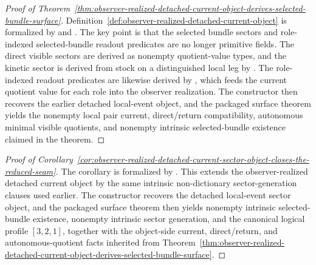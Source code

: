 \begin{proof}[Proof of Theorem~\ref{thm:observer-realized-detached-current-object-derives-selected-bundle-surface}]
\label{proof:thm:observer-realized-detached-current-object-derives-selected-bundle-surface}
Definition~\ref{def:observer-realized-detached-current-object} is formalized by
 and
. The key point is that the selected
bundle sectors and role-indexed selected-bundle readout predicates are no
longer primitive fields. The direct visible sectors are derived as nonempty
quotient-value types, and the kinetic sector is derived from stock on a
distinguished local leg by
. The role-indexed
readout predicates are likewise derived by
, which
feeds the current quotient value for each role into the observer realization.
The constructor 
then recovers the earlier detached local-event object, and the packaged
surface theorem  yields the
nonempty local pair current, direct/return compatibility, autonomous minimal
visible quotients, and nonempty intrinsic selected-bundle existence claimed in
the theorem.
\end{proof}

\begin{proof}[Proof of Corollary~\ref{cor:observer-realized-detached-current-sector-object-closes-the-reduced-seam}]
\label{proof:cor:observer-realized-detached-current-sector-object-closes-the-reduced-seam}
The corollary is formalized by .
This extends the observer-realized detached current object by the same
intrinsic non-dictionary sector-generation clauses used earlier. The
constructor 
recovers the detached local-event sector object, and the packaged surface
theorem  then yields
nonempty intrinsic selected-bundle existence, nonempty intrinsic sector
generation, and the canonical logical profile \([3,2,1]\), together with the
object-side current, direct/return, and autonomous-quotient facts inherited
from Theorem~\ref{thm:observer-realized-detached-current-object-derives-selected-bundle-surface}.
\end{proof}

